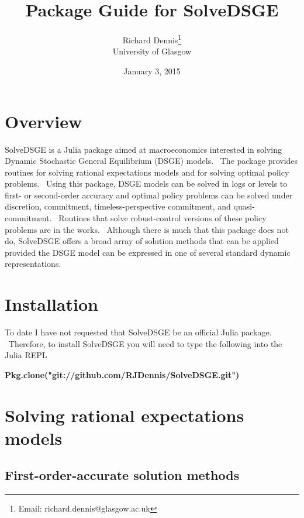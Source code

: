 \documentclass[thmsa,notitlepage,11pt]{article}
\begin{document}
\author{Richard Dennis\thanks{%
Email: richard.dennis@glasgow.ac.uk} \\
University of Glasgow}
\title{\textbf{Package Guide for SolveDSGE}\vspace{0.2in}}
\date{January 3, 2015}
\maketitle

\thispagestyle{empty}\newpage \setlength{\baselineskip}{18.95pt}%
\setcounter{page}{1}

\section{Overview}

SolveDSGE is a Julia package aimed at macroeconomics interested in solving
Dynamic Stochastic General Equilibrium (DSGE) models. \ The package provides
routines for solving rational expectations models and for solving optimal
policy problems. \ Using this package, DSGE models can be solved in logs or
levels to first- or second-order accuracy and optimal policy problems can be
solved under discretion, commitment, timeless-perspective commitment, and
quasi-commitment. \ Routines that solve robust-control versions of these
policy problems are in the works. \ Although there is much that this package
does not do, SolveDSGE offers a broad array of solution methods that can be
applied provided the DSGE model can be expressed in one of several standard
dynamic representations.

\section{Installation}

To date I have not requested that SolveDSGE be an official Julia package. \
Therefore, to install SolveDSGE you will need to type the following into the
Julia REPL

\bigskip

\textbf{Pkg.clone("git://github.com/RJDennis/SolveDSGE.git")}

\bigskip

\section{Solving rational expectations models}

\subsection{First-order-accurate solution methods}
\end{document}
